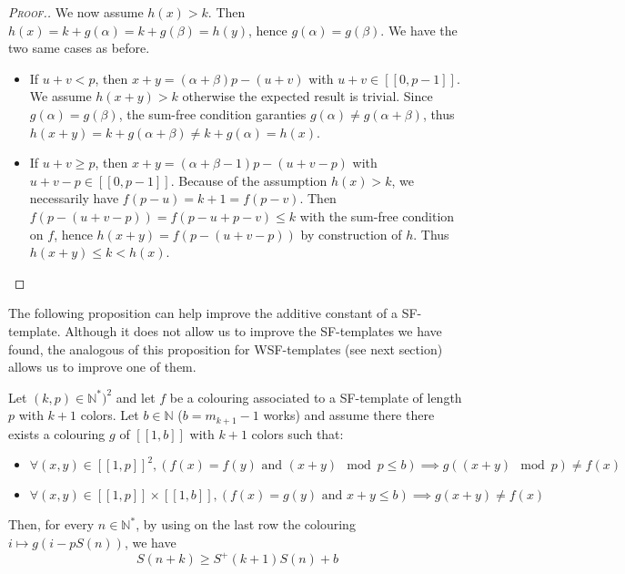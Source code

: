 \begin{proof}[\textsc{Proof.}]
We now assume \(h(x) > k\). Then \(h(x) = k + g(\alpha) = k + g(\beta) = h(y)\), hence \(g(\alpha) = g(\beta)\). 
We have the two same cases as before.

\begin{itemize}
\item If \(u+v < p\), then \(x+y = (\alpha+\beta)p - (u+v) \) with \(u+v \in [\![0,p-1]\!] \).
We assume \(h(x+y) > k\) otherwise the expected result is trivial.
Since \(g(\alpha) = g(\beta)\), the sum-free condition garanties \(g(\alpha) \neq g(\alpha+\beta)\), 
thus \(h(x+y) = k + g(\alpha + \beta) \neq k + g(\alpha) = h(x)\).
\item If \(u+v \geqslant p\), then \(x+y = (\alpha+\beta-1)p - (u+v-p) \) with \(u+v-p \in [\![0,p-1]\!] \).
Because of the assumption \(h(x) > k\), we necessarily have \(f(p-u) = k+1 = f(p-v)\). 
Then \(f(p-(u+v-p)) = f(p-u + p-v) \leqslant k \) with the sum-free condition on \(f\), 
hence \(h(x+y) = f(p-(u+v-p)) \) by construction of \(h\). Thus \(h(x+y) \leqslant k < h(x)\).
\end{itemize}
\end{proof}

The following proposition can help improve the additive constant of a SF-template. Although it does not allow us to 
improve the SF-templates we have found, the analogous of this proposition for WSF-templates (see next section) 
allows us to improve one of them.

\begin{proposition}
Let \((k, p) \in \mathbb{N}^*)^2\) and let \(f\) be a colouring associated to a SF-template of length \(p\) with \(k+1\) 
colors. Let \(b \in \mathbb{N}\) (\(b = m_{k+1} - 1\) works) and assume there there exists a colouring \(g\) of 
\([\![1, b]\!]\) with \(k+1\) colors such that:

\begin{itemize}
	\item \(\forall (x, y) \in [\![1, p]\!]^2,(f(x) = f(y) \text{ and } (x + y) \mod p \leqslant b) 
	\implies g((x + y) \mod p) \neq f(x)\)
	\item \(\forall (x, y) \in [\![1, p]\!] \times  [\![1, b]\!], (f(x) = g(y) \text{ and } x + y \leqslant b) 
	\implies g(x + y) \neq f(x)\)
\end{itemize}

Then, for every \(n \in \mathbb{N}^*\), by using on the last row the colouring \(i \longmapsto g(i - p S(n))\), we have
\[ S(n+k) \geqslant S^+(k+1)S(n) + b\]
\end{proposition}


